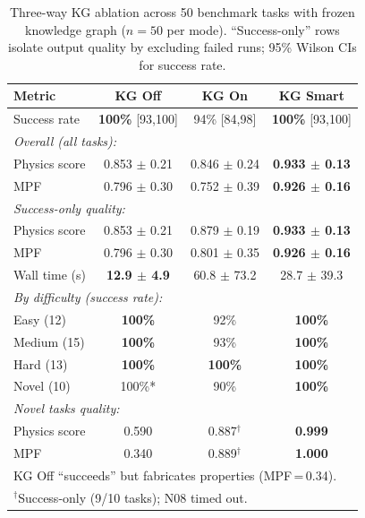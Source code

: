 \begin{table}[htbp]
\centering\footnotesize
\caption{Three-way KG ablation across 50 benchmark tasks with frozen
         knowledge graph ($n{=}50$ per mode).  ``Success-only'' rows isolate
         output quality by excluding failed runs;   95\% Wilson CIs
         for success rate.}
\label{tab:ablation}
\setlength{\tabcolsep}{4pt}
\begin{tabular}{lccc}
\toprule
Metric & KG Off & KG On & KG Smart \\
\midrule
  Success rate          & \textbf{100\%} [93,100] & 94\% [84,98] & \textbf{100\%} [93,100]  \\[2pt]
\multicolumn{4}{l}{\textit{Overall (all tasks):}} \\
  \quad Physics score   & 0.853 $\pm$ 0.21 & 0.846 $\pm$ 0.24 & \textbf{0.933 $\pm$ 0.13} \\
  \quad MPF             & 0.796 $\pm$ 0.30 & 0.752 $\pm$ 0.39 & \textbf{0.926 $\pm$ 0.16} \\[2pt]
\multicolumn{4}{l}{\textit{Success-only quality:}} \\
  \quad Physics score   & 0.853 $\pm$ 0.21 & 0.879 $\pm$ 0.19 & \textbf{0.933 $\pm$ 0.13} \\
  \quad MPF             & 0.796 $\pm$ 0.30 & 0.801 $\pm$ 0.35 & \textbf{0.926 $\pm$ 0.16} \\[2pt]
  Wall time (s)         & \textbf{12.9 $\pm$ 4.9} & 60.8 $\pm$ 73.2 & 28.7 $\pm$ 39.3 \\
\midrule
\multicolumn{4}{l}{\textit{By difficulty (success rate):}} \\
  \quad Easy (12)       & \textbf{100\%}  & 92\%  & \textbf{100\%}  \\
  \quad Medium (15)     & \textbf{100\%}  & 93\%  & \textbf{100\%} \\
  \quad Hard (13)       & \textbf{100\%}  & \textbf{100\%}  & \textbf{100\%}  \\
  \quad Novel (10)      & 100\%* & 90\%  & \textbf{100\%}  \\
\midrule
\multicolumn{4}{l}{\textit{Novel tasks quality:}} \\
  \quad Physics score   & 0.590  & 0.887$^\dagger$ & \textbf{0.999} \\
  \quad MPF             & 0.340  & 0.889$^\dagger$ & \textbf{1.000} \\
\bottomrule
\multicolumn{4}{l}{\scriptsize *KG Off ``succeeds'' but fabricates properties (MPF\,=\,0.34).}\\
\multicolumn{4}{l}{\scriptsize $^\dagger$Success-only (9/10 tasks); N08 timed out.}\\
\end{tabular}
\end{table}
